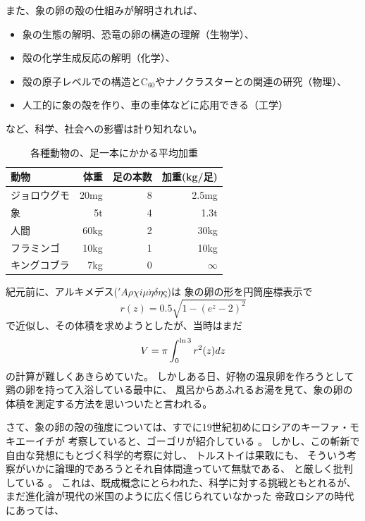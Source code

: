 \documentclass[11pt,a4paper,twoside]{jarticle}
\newcommand{\研究種別}{A}	%
\newcommand{\研究課題名}{コ・クリエイティブなソフトウェア開発のPBL型教育}
\newcommand{\研究機関名}{産業技術大学院大学}
\newcommand{\研究代表者氏名}{中鉢　欣秀}
\newcommand{\研究代表者氏名ふりがな}{ちゅうばち　よしひで}
\newcommand{\本応募effort}{\KLEffort{18}}	%
\newcommand{\研究期間の最終元号年度}{27}	%
\begin{document}
{    
    また、象の卵の殻の仕組みが解明されれば、
	\begin{itemize}
		\item 象の生態の解明、恐竜の卵の構造の理解（生物学）、
		\item 殻の化学生成反応の解明（化学）、
		\item 殻の原子レベルでの構造とC$_{60}$やナノクラスターとの関連の研究（物理）、
		\item 人工的に象の殻を作り、車の車体などに応用できる（工学）
	\end{itemize}
	など、科学、社会への影響は計り知れない。

         \begin{table}
         		\caption{各種動物の、足一本にかかる平均加重}
		\label{tab:load}
         		\begin{tabular}{lrrr}
			\hline
			動物 & 体重 & 足の本数 & 加重(kg/足)\\
			\hline
			ジョロウグモ	& 20mg	& 8	& 2.5mg \\
			象 			& 5t & 4	& 1.3t \\
			人間 			& 60kg	& 2	& 30kg\\
			フラミンゴ	& 10kg	& 1	& 10kg\\
			キングコブラ	& 7kg	& 0	& $\infty$\\
			\hline
		\end{tabular}
         \end{table}

         紀元前に、アルキメデス(\('A\rho\chi i\mu\acute{\eta}\delta\eta\mbox{\c{c}}\))は
	象の卵の形を円筒座標表示で
         \[r(z) = 0.5\sqrt{1-(e^z-2)^2}\]
         で近似し、その体積を求めようとしたが、当時はまだ
         \begin{equation}
	         V  = \pi \int_0^{\ln 3} r^2(z) dz\\
         \end{equation}
         の計算が難しくあきらめていた。
         しかしある日、好物の温泉卵を作ろうとして鶏の卵を持って入浴している最中に、
         風呂からあふれるお湯を見て、象の卵の体積を測定する方法を思いついたと言われる。
 
	さて、象の卵の殻の強度については、すでに19世紀初めにロシアのキーファ・モキエーイチが
	考察していると、ゴーゴリが紹介している
	\cite{gogori}。
	しかし、この斬新で自由な発想にもとづく科学的考察に対し、
	トルストイは果敢にも、
	そういう考察がいかに論理的であろうとそれ自体間違っていて無駄である、
	と厳しく批判している
	\cite{torusutoi}。
	これは、既成概念にとらわれた、科学に対する挑戦ともとれるが、
	まだ進化論が現代の米国のように広く信じられていなかった
	帝政ロシアの時代にあっては、

}
\end{document}
